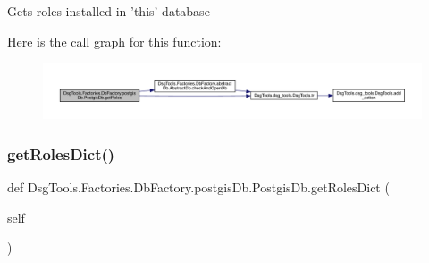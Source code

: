 \begin{DoxyVerb}Gets roles installed in 'this' database
\end{DoxyVerb}
 Here is the call graph for this function\+:
\nopagebreak
\begin{figure}[H]
\begin{center}
\leavevmode
\includegraphics[width=350pt]{class_dsg_tools_1_1_factories_1_1_db_factory_1_1postgis_db_1_1_postgis_db_af105326db5d4561a3efceb80427a638e_cgraph}
\end{center}
\end{figure}
\mbox{\label{class_dsg_tools_1_1_factories_1_1_db_factory_1_1postgis_db_1_1_postgis_db_a1610b2ba4a7dce980f65c02acbf15b01}} 
\subsubsection{\texorpdfstring{get\+Roles\+Dict()}{getRolesDict()}}
{\footnotesize\ttfamily def Dsg\+Tools.\+Factories.\+Db\+Factory.\+postgis\+Db.\+Postgis\+Db.\+get\+Roles\+Dict (\begin{DoxyParamCaption}\item[{}]{self }\end{DoxyParamCaption})}

